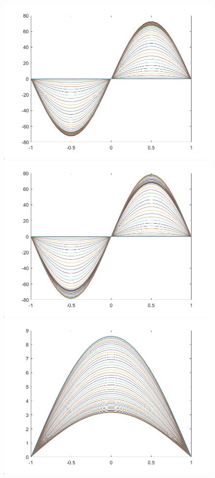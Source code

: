 \documentclass[11pt, a4paper]{article}
\theoremstyle{definition}
\begin{document}
\begin{figure}[h]
	\includegraphics[scale=0.3]{Dexpw1.jpg}
	\includegraphics[scale=0.3]{Dexpw2.jpg}
	\includegraphics[scale=0.3]{Dexprho1.jpg}

\end{figure}
\end{document}
